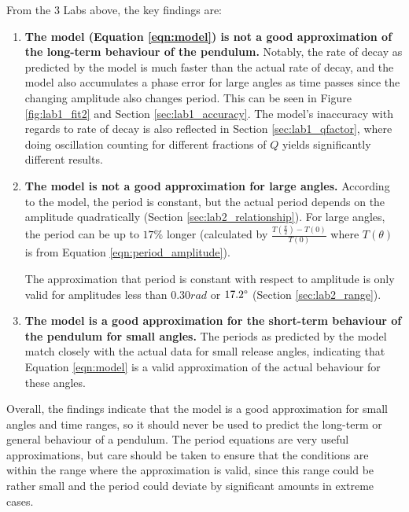 \documentclass[aps,twocolumn,secnumarabic,nobalancelastpage,amsmath,amssymb,nofootinbib,floatfix,letterpaper]{revtex4}
\begin{document}
From the 3 Labs above, the key findings are:
\begin{enumerate}
    \item
        \textbf{The model (Equation \ref{eqn:model}) is not a good approximation of the long-term behaviour of the
        pendulum.} Notably, the rate of decay as predicted by the model is much faster than the actual rate of decay,
        and the model also accumulates a phase error for large angles as time passes since the changing amplitude
        also changes period. This can be seen in Figure \ref{fig:lab1_fit2} and Section \ref{sec:lab1_accuracy}.
        The model's inaccuracy with regards to rate of decay is also reflected in Section \ref{sec:lab1_qfactor},
        where doing oscillation counting for different fractions of \(Q\) yields significantly different results.
    \item
        \textbf{The model is not a good approximation for large angles.} According to the model, the period is constant,
        but the actual period depends on the amplitude quadratically (Section \ref{sec:lab2_relationship}). For large
        angles, the period can be up to \(17\%\) longer (calculated by \(\frac{T\left(\frac{\pi}{2}\right) - T(0)}{T(0)}\)
        where \(T(\theta)\) is from Equation \ref{eqn:period_amplitude}).

        The approximation that period is constant with respect to amplitude is only valid for amplitudes less than
        \(0.30\si{rad}\) or \(17.2\degree\) (Section \ref{sec:lab2_range}).
    \item
        \textbf{The model is a good approximation for the short-term behaviour of the pendulum for small angles.}
        The periods as predicted by the model match closely with the actual data for small release angles, indicating
        that Equation \ref{eqn:model} is a valid approximation of the actual behaviour for these angles.
\end{enumerate}

Overall, the findings indicate that the model is a good approximation for small angles and time ranges, so it should
never be used to predict the long-term or general behaviour of a pendulum. The period equations are very useful
approximations, but care should be taken to ensure that the conditions are within the range where the approximation is
valid, since this range could be rather small and the period could deviate by significant amounts in extreme cases.
\end{document}
